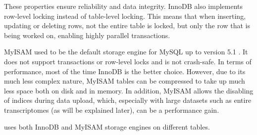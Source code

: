 These properties ensure reliability and data integrity. InnoDB also implements
row-level locking instead of table-level locking. This means that when
inserting, updating or deleting rows, not the entire table is locked, but only
the row that is being worked on, enabling highly parallel transactions. 

MyISAM used to be the default storage engine for MySQL up to version 5.1
\citep{schwartz2012}. It does not support transactions or row-level locks and is
not crash-safe. In terms of performance, most of the time InnoDB is the better
choice. However, due to its much less complex nature, MyISAM tables can be
compressed to take up much less space both on disk and in memory. In addition,
MyISAM allows the disabling of indices during data upload, which, especially
with large datasets such as entire transcriptomes (as will be explained later),
can be a performance gain. 

\pname uses both InnoDB and MyISAM storage engines on different tables. 
